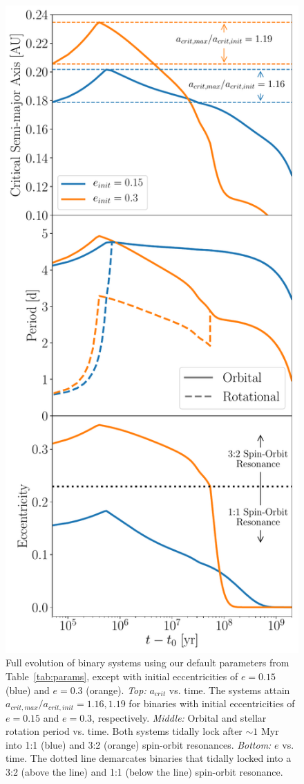 \begin{figure}
	\includegraphics[scale=0.5]{ecc_comp.pdf}
   \caption{Full evolution of binary systems using our default parameters from Table~\ref{tab:params}, except with initial eccentricities of $e = 0.15$ (blue) and $e = 0.3$ (orange).  {\it Top:} $a_{crit}$ vs. time.  The systems attain $a_{crit,max}/a_{crit,init} = 1.16, 1.19$ for binaries with initial eccentricities of $e = 0.15$ and $e = 0.3$, respectively. {\it Middle:} Orbital and stellar rotation period vs. time.  Both systems tidally lock after ${\sim}1$ Myr into 1:1 (blue) and 3:2 (orange) spin-orbit resonances.  {\it Bottom:} $e$ vs. time.  The dotted line demarcates binaries that tidally locked into a 3:2 (above the line) and 1:1 (below the line) spin-orbit resonance.}
    \label{fig:ecc_comp}
\end{figure}

